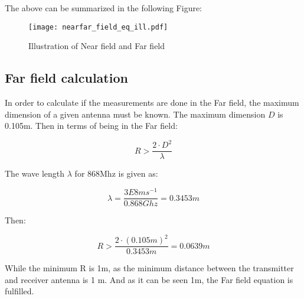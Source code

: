 The above can be summarized in the following Figure:

\begin{figure}[H]
\centering
\texttt{[image: nearfar\_field\_eq\_ill.pdf]}
\caption{Illustration of Near field and Far field \citep{farnear_field1}}
\label{nearfarf_eq_ill}
\end{figure}


\subsection{Far field calculation}

In order to calculate if the measurements are done in the Far field, the maximum dimension of a given antenna must be known. The maximum dimension $D$ is 0.105m. Then in terms of being in the Far field:

\begin{equation}
R > \frac{2 \cdot D^{2}}{\lambda}
\label{far_field_eq1}
\end{equation}



The wave length $\lambda$ for 868Mhz is given as:

\begin{equation}
\lambda = \frac{3E8 ms^{-1}}{0.868 Ghz} = 0.3453m
\end{equation}

Then:

\begin{equation}
R> \frac{2 \cdot (0.105m)^{2}}{0.3453m} = 0.0639 m 
\end{equation} 

While the minimum R is 1m, as the minimum distance between the transmitter and receiver antenna is 1 m. And as it can be seen 1m, the Far field equation is fulfilled. 